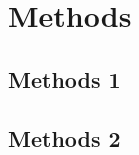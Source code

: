\section{Methods} 
\label{sec:methods}

\subsection{Methods 1}
\label{sub:methods_1}

\lipsum[1-3]

\subsection{Methods 2}
\label{sub:methods_2}

\lipsum[1-3]
